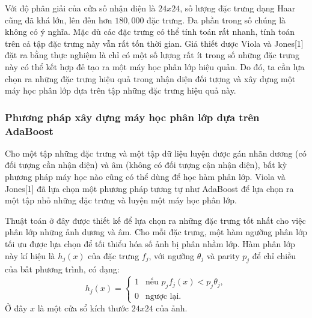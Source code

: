 \documentclass[14pt, oneside, a4paper, openany]{scrartcl}
\begin{document}
Với độ phân giải của cửa số nhận diện là $24x24$, số lượng đặc trưng dạng Haar cũng đã khá lớn, lên đến hơn $180,000$ đặc trưng. Đa phần trong số chúng là không có ý nghĩa. Mặc dù các đặc trưng có thể tính toán rất nhanh, tính toán trên cả tập đặc trưng này vẫn rất tốn thời gian. Giả thiết dược Viola và Jones[1] đặt ra bằng thực nghiệm là chỉ có một số lượng rất ít trong số những đặc trưng này có thể kết hợp đẻ tạo ra một máy học phân lớp hiệu quản. Do đó, ta cần lựa chọn ra những đặc trưng hiệu quả trong nhận diện đối tượng và xây dựng một máy học phân lớp dựa trên tập những đặc trưng hiệu quả này.

\subsubsection{Phương pháp xây dựng máy học phân lớp dựa trên AdaBoost}
Cho một tập những đặc trưng và một tập dữ liệu luyện được gán nhãn dương (có đối tượng cần nhận diện) và âm (không có đối tượng cận nhận diện), bất kỳ phương pháp máy học nào cũng có thể dùng để học hàm phân lớp. Viola và Jones[1] đã lựa chọn một phương pháp tương tự như AdaBoost để lựa chọn ra một tập nhỏ những đặc trưng và luyện một máy học phân lớp.

Thuật toán ở đây được thiết kế để lựa chọn ra những đặc trưng tốt nhất cho việc phân lớp những ảnh dương và âm.
Cho mỗi đặc trưng, một hàm ngưỡng phân lớp tối ưu được lựa chọn để tối thiểu hóa số ảnh bị phân nhầm lớp. Hàm phân lớp này kí hiệu là $h_j(x)$ của đặc trưng $f_j$, với ngưỡng $\theta_j$ và parity $p_j$ để chỉ chiều của bất phương trình, có dạng:
$$
h_j(x)=
\begin{cases}
	1& \text{nếu $p_j f_j(x) < p_j\theta_j$},\\
	0& \text{ngược lại}.
\end{cases}
$$
Ở đây $x$ là một cửa sổ kích thước $24x24$ của ảnh.
\end{document}
